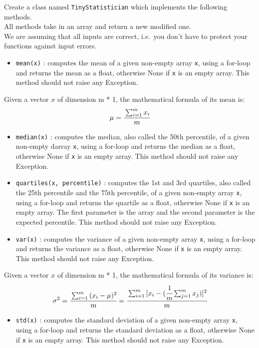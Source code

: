 \documentclass[]{article}
\providecommand{\tightlist}{%
  \setlength{\itemsep}{0pt}\setlength{\parskip}{0pt}}
\begin{document}
Create a class named \texttt{TinyStatistician} which implements the
following methods.\\
All methods take in an array and return a new modified one.\\
We are assuming that all inputs are correct, i.e.~you don't have to
protect your functions against input errors.

\begin{itemize}
\tightlist
\item
  \texttt{mean(x)} : computes the mean of a given non-empty array
  \texttt{x}, using a for-loop and returns the mean as a float,
  otherwise None if \texttt{x} is an empty array. This method should not
  raise any Exception.
\end{itemize}

Given a vector \(x\) of dimension m * 1, the mathematical formula of its
mean is: \large \[
\mu = \cfrac{\sum_{i = 1}^{m}{x_i}}{m}
\] \normalsize

\begin{itemize}
\item
  \texttt{median(x)} : computes the median, also called the 50th
  percentile, of a given non-empty darray \texttt{x}, using a for-loop
  and returns the median as a float, otherwise None if \texttt{x} is an
  empty array. This method should not raise any Exception.
\item
  \texttt{quartiles(x,\ percentile)} : computes the 1st and 3rd
  quartiles, also called the 25th percentile and the 75th percentile, of
  a given non-empty array \texttt{x}, using a for-loop and returns the
  quartile as a float, otherwise None if \texttt{x} is an empty array.
  The first parameter is the array and the second parameter is the
  expected percentile. This method should not raise any Exception.
\item
  \texttt{var(x)} : computes the variance of a given non-empty array
  \texttt{x}, using a for-loop and returns the variance as a float,
  otherwise None if \texttt{x} is an empty array. This method should not
  raise any Exception.
\end{itemize}

Given a vector \(x\) of dimension m * 1, the mathematical formula of its
variance is: \large \[
\sigma^2 = \cfrac{\sum_{i = 1}^{m}{(x_i - \mu)^2}}{m} = \cfrac{\sum_{i = 1}^{m}{[x_i - (\cfrac{1}{m}\sum_{j = 1}^{m}{x_j}})]^2}{m}
\] \normalsize

\begin{itemize}
\tightlist
\item
  \texttt{std(x)} : computes the standard deviation of a given non-empty
  array \texttt{x}, using a for-loop and returns the standard deviation
  as a float, otherwise None if \texttt{x} is an empty array. This
  method should not raise any Exception.
\end{itemize}
\end{document}

